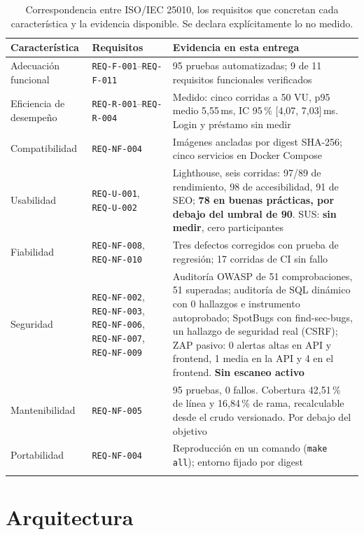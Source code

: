 \documentclass[11pt,a4paper]{article}
\newcommand{\req}[1]{\texttt{#1}}
\begin{document}
\begin{longtable}{@{}p{2.9cm}p{3.4cm}p{7.4cm}@{}}
\toprule
\textbf{Característica} & \textbf{Requisitos} & \textbf{Evidencia en esta entrega} \\
\midrule
\endhead
Adecuación funcional & \req{REQ-F-001}--\req{REQ-F-011} & 95 pruebas automatizadas; 9 de 11 requisitos funcionales verificados \\
Eficiencia de desempeño & \req{REQ-R-001}--\req{REQ-R-004} & Medido: cinco corridas a 50 VU, p95 medio 5,55\,ms, IC 95\,\% [4,07, 7,03]\,ms. Login y préstamo sin medir \\
Compatibilidad & \req{REQ-NF-004} & Imágenes ancladas por digest SHA-256; cinco servicios en Docker Compose \\
Usabilidad & \req{REQ-U-001}, \req{REQ-U-002} & Lighthouse, seis corridas: 97/89 de rendimiento, 98 de accesibilidad, 91 de SEO; \textbf{78 en buenas prácticas, por debajo del umbral de 90}. SUS: \textbf{sin medir}, cero participantes \\
Fiabilidad & \req{REQ-NF-008}, \req{REQ-NF-010} & Tres defectos corregidos con prueba de regresión; 17 corridas de CI sin fallo \\
Seguridad & \req{REQ-NF-002}, \req{REQ-NF-003}, \req{REQ-NF-006}, \req{REQ-NF-007}, \req{REQ-NF-009} & Auditoría OWASP de 51 comprobaciones, 51 superadas; auditoría de SQL dinámico con 0 hallazgos e instrumento autoprobado; SpotBugs con find-sec-bugs, un hallazgo de seguridad real (CSRF); ZAP pasivo: 0 alertas altas en API y frontend, 1 media en la API y 4 en el frontend. \textbf{Sin escaneo activo} \\
Mantenibilidad & \req{REQ-NF-005} & 95 pruebas, 0 fallos. Cobertura 42,51\,\% de línea y 16,84\,\% de rama, recalculable desde el crudo versionado. Por debajo del objetivo \\
Portabilidad & \req{REQ-NF-004} & Reproducción en un comando (\texttt{make all}); entorno fijado por digest \\
\bottomrule
\caption{Correspondencia entre ISO/IEC 25010, los requisitos que concretan cada
característica y la evidencia disponible. Se declara explícitamente lo no
medido.}
\label{tab:25010}
\end{longtable}

\section{Arquitectura}\label{sec:arquitectura}
\end{document}
